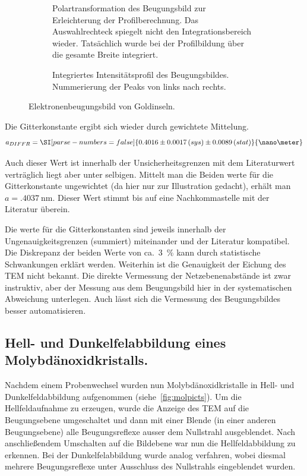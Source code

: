 \documentclass[slug=TEM, room=IFW, supervisor=?, coursedate=23.\ 01.\ 2020]{../../Lab_Report_LaTeX/lab_report}
\begin{document}
\begin{figure}[hp]
\begin{subfigure}{.4\textwidth}
    \caption{Polartransformation des Beugungsbild zur Erleichterung
      der Profilberechnung. Das Auswahlrechteck spiegelt nicht den
      Integrationsbereich wieder. Tats\"achlich wurde bei der
      Profilbildung \"uber die gesamte Breite integriert.}%
    \label{fig:ebeug_polar}
  \end{subfigure}
  \begin{subfigure}{\textwidth}
    \centering \resizebox{1\textwidth}{!}{%
      }
    \caption{Integriertes Intensit\"atsprofil des
      Beugungsbildes. Nummerierung der Peaks von links nach rechts.}%
    \label{fig:gold_diffr-profile}
  \end{subfigure}
  \caption{Elektronenbeugungsbild von Goldinseln.}
  \label{fig:ebeug}
\end{figure}

Die Gitterkonstante ergibt sich wieder durch gewichtete Mittelung.
\begin{equation}
  \label{eq:ahrtem}
  a_{DIFFR} = \SI[parse-numbers=false]{0.4016\pm 0.0017\,(sys)\pm 0.0089\,(stat)}{\nano\meter}
\end{equation}

Auch dieser Wert ist innerhalb der Unsicherheitsgrenzen mit dem
Literaturwert vertr\"aglich liegt aber unter selbigen. Mittelt man die
Beiden werte f\"ur die Gitterkonstante ungewichtet (da hier nur zur
Illustration gedacht), erhält man
\(a=\SI{.4037}{\nano\meter}\). Dieser Wert stimmt bis auf eine
Nachkommastelle mit der Literatur \"uberein.

Die werte f\"ur die Gitterkonstanten sind jeweils innerhalb der
Ungenauigkeitsgrenzen (summiert) miteinander und der Literatur
kompatibel. Die Diskrepanz der beiden Werte von ca.~\SI{3}{\percent}
kann durch statistische Schwankungen erkl\"art werden. Weiterhin ist
die Genauigkeit der Eichung des TEM nicht bekannt. Die direkte
Vermessung der Netzebenenabst\"ande ist zwar instruktiv, aber der
Messung aus dem Beugungsbild hier in der systematischen Abweichung
unterlegen. Auch l\"asst sich die Vermessung des Beugungsbildes besser
automatisieren.

\subsection{Hell- und Dunkelfelabbildung eines Molybd\"anoxidkristalls.}
\label{sec:molyb}
Nachdem einem Probenwechsel wurden nun Molybd\"anoxidkristalle in
Hell- und Dunkelfeldabbildung aufgenommen (siehe~\ref{fig:molpicts}).
Um die Hellfeldaufnahme zu erzeugen, wurde die Anzeige des TEM auf die
Beugungsebene umgeschaltet und dann mit einer Blende (in einer anderen
Beugungsebene) alle Beugungsreflexe ausser dem Nullstrahl
ausgeblendet. Nach anschlie\ss{}endem Umschalten auf die Bildebene war
nun die Hellfeldabbildung zu erkennen. Bei der Dunkelfelabbildung
wurde analog verfahren, wobei diesmal mehrere Beugungsreflexe unter
Ausschluss des Nullstrahls eingeblendet wurden.
\end{document}
